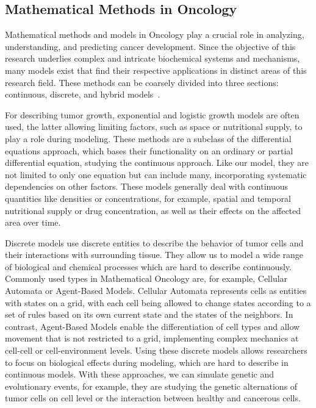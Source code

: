 \subsection{Mathematical Methods in Oncology}
Mathematical methods and models in Oncology play a crucial role in analyzing, understanding, and predicting cancer development. Since the objective of this research underlies complex and intricate biochemical systems and mechanisms, many models exist that find their respective applications in distinct areas of this research field. These methods can be coarsely divided into three sections: continuous, discrete, and hybrid models~\cite{BEKISZ2020101198}.

For describing tumor growth, exponential and logistic growth models are often used, the latter allowing limiting factors, such as space or nutritional supply, to play a role during modeling. These methods are a subclass of the differential equations approach, which bases their functionality on an ordinary or partial differential equation, studying the continuous approach. Like our model, they are not limited to only one equation but can include many, incorporating systematic dependencies on other factors. These models generally deal with continuous quantities like densities or concentrations, for example, spatial and temporal nutritional supply or drug concentration, as well as their effects on the affected area over time. 

Discrete models use discrete entities to describe the behavior of tumor cells and their interactions with surrounding tissue. They allow us to model a wide range of biological and chemical processes which are hard to describe continuously. Commonly used types in Mathematical Oncology are, for example, Cellular Automata or Agent-Based Models. Cellular Automata represents cells as entities with states on a grid, with each cell being allowed to change states according to a set of rules based on its own current state and the states of the neighbors. In contrast, Agent-Based Models enable the differentiation of cell types and allow movement that is not restricted to a grid, implementing complex mechanics at cell-cell or cell-environment levels. Using these discrete models allows researchers to focus on biological effects during modeling, which are hard to describe in continuous models. With these approaches, we can simulate genetic and evolutionary events, for example, they are studying the genetic alternations of tumor cells on cell level or the interaction between healthy and cancerous cells.

